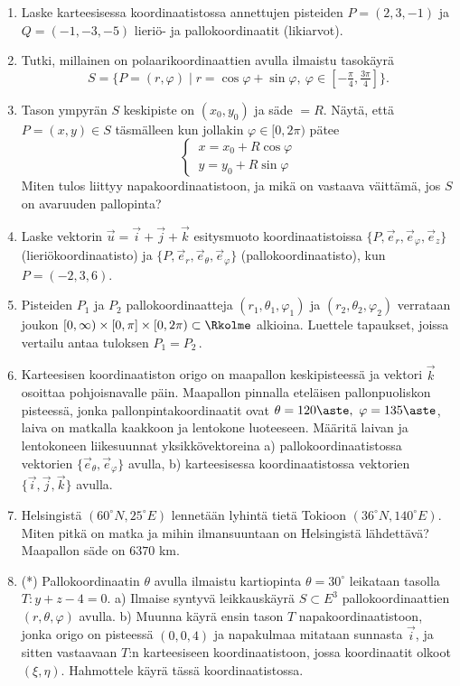 \Harj
\begin{enumerate}

\item
Laske karteesisessa koordinaatistossa annettujen pisteiden $P=(2,3,-1)$ ja $Q=(-1,-3,-5)$ 
lieriö- ja pallokoordinaatit (likiarvot).

\item
Tutki, millainen on polaarikoordinaattien avulla ilmaistu tasokäyrä
\[
S=\{P=(r,\varphi) \mid r=\cos\varphi+\sin\varphi,\ \varphi\in[-\tfrac{\pi}{4},\tfrac{3\pi}{4}]\}.
\]

\item
Tason ympyrän $S$ keskipiste on $(x_0,y_0)$ ja säde $=R$. Näytä, että \newline$P=(x,y) \in S$
täsmälleen kun jollakin $\varphi\in[0,2\pi)$ pätee
\[ \begin{cases}
\,x=x_0+R\cos\varphi \\ \,y=y_0+R\sin\varphi
\end{cases} \]
Miten tulos liittyy napakoordinaatistoon, ja mikä on vastaava väittämä, jos $S$ on avaruuden 
pallopinta?

\item
Laske vektorin $\vec u=\vec i+\vec j+\vec k$ esitysmuoto koordinaatistoissa 
$\{P,\vec e_r,\vec e_\varphi,\vec e_z\}$ (lieriökoordinaatisto) ja
$\{P,\vec e_r,\vec e_\theta,\vec e_\varphi\}$ (pallokoordinaatisto), kun \newline
$P=(-2,3,6)$.

\item
Pisteiden $P_1$ ja $P_2$ pallokoordinaatteja $(r_1,\theta_1,\varphi_1)$ ja 
$(r_2,\theta_2,\varphi_2)$ verrataan joukon $[0,\infty)\times[0,\pi]\times[0,2\pi)\subset\Rkolme$
alkioina. Luettele tapaukset, joissa vertailu antaa tuloksen $P_1=P_2$\,.

\item
Karteesisen koordinaatiston origo on maapallon keskipisteessä ja vektori $\vec k$ osoittaa
pohjoisnavalle päin. Maapallon pinnalla eteläisen pallonpuoliskon pisteessä, jonka
pallonpintakoordinaatit ovat $\theta=120\aste,\ \varphi=135\aste$, laiva on matkalla kaakkoon
ja lentokone luoteeseen. Määritä laivan ja lentokoneen liikesuunnat yksikkövektoreina 
a) pallokoordinaatistossa vektorien $\{\vec e_\theta,\vec e_\varphi\}$ avulla,
b) karteesisessa koordinaatistossa vektorien $\{\vec i,\vec j,\vec k\}$ avulla.

\item
Helsingistä $(60^{\circ}N,25^{\circ}E)$ lennetään lyhintä tietä Tokioon 
 $(36^{\circ}N,140^{\circ}E)$. Miten pitkä on matka ja mihin 
ilmansuuntaan on Helsingistä lähdettävä? Maapallon säde on $6370$ km.

\item (*)
Pallokoordinaatin $\theta $ avulla ilmaistu kartiopinta $\theta =30^{\circ} $
leikataan tasolla $T: y+z-4=0$. a) Ilmaise syntyvä leikkauskäyrä 
$S\subset E^3$ pallokoordinaattien $(r,\theta ,\varphi)$ avulla.
b) Muunna käyrä ensin tason $T$ napakoordinaatistoon, jonka origo on pisteessä 
$(0,0,4)$ ja napakulmaa mitataan sunnasta $\vec i$, ja sitten vastaavaan
$T$:n karteesiseen koordinaatistoon, jossa koordinaatit olkoot $(\xi,\eta)$. Hahmottele käyrä 
tässä koordinaatistossa.

\end{enumerate}
